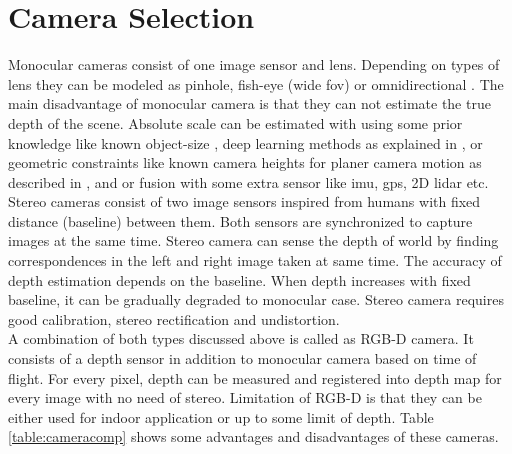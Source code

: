 \section{Camera Selection}
Monocular cameras consist of one image sensor and lens. Depending on types of lens they can be modeled as pinhole, fish-eye (wide \acrshort{fov}) or omnidirectional \cite{multiview_geometry}. The main disadvantage of monocular camera is that they can not estimate the true depth of the scene. Absolute scale can be estimated with using some prior knowledge like known object-size \cite{citymodel}, deep learning methods as explained in \cite{synthetic}, \cite{deepl} or geometric constraints like known camera heights for planer camera motion as described in \cite{ground}, \cite{geometric} and \cite{planer} or fusion with some extra sensor like \acrshort{imu}, \acrshort{gps}, 2D \acrshort{lidar} etc. \\
\newline
Stereo cameras consist of two image sensors inspired from humans with fixed distance (baseline) between them. Both sensors are synchronized to capture images at the same time. Stereo camera can sense the depth of world by finding correspondences in the left and right image taken at same time. The accuracy of depth estimation depends on the baseline. When depth increases with fixed baseline, it can be gradually degraded to monocular case. Stereo camera requires good calibration, stereo rectification and undistortion. \\
\newline
A combination of both types discussed above is called as RGB-D camera. It consists of a depth sensor in addition to monocular camera based on time of flight. For every pixel, depth can be measured and registered into depth map for every image with no need of stereo. Limitation of RGB-D is that they can be either used for indoor application or up to some limit of depth. Table \ref{table:cameracomp} shows some advantages and disadvantages of these cameras.\\
